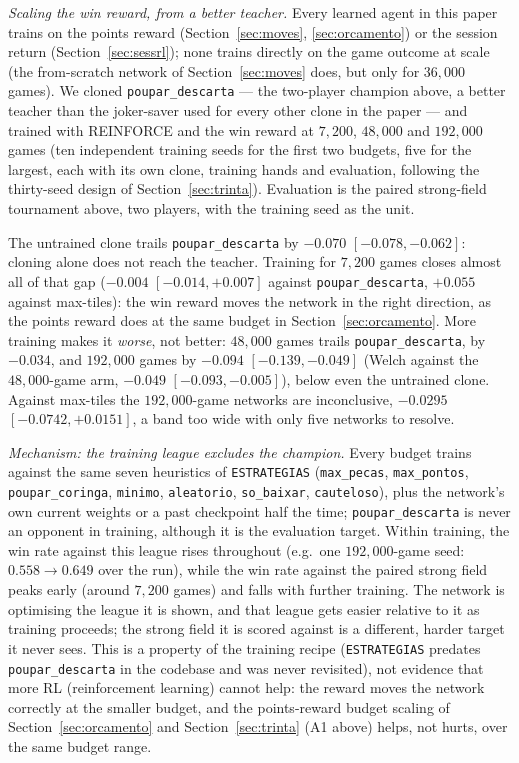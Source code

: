 \documentclass[11pt]{article}
\begin{document}
\emph{Scaling the win reward, from a better teacher.} Every learned agent in this paper trains on the points reward (Section~\ref{sec:moves}, \ref{sec:orcamento}) or the session return (Section~\ref{sec:sessrl}); none trains directly on the game outcome at scale (the from-scratch network of Section~\ref{sec:moves} does, but only for $36{,}000$ games). We cloned \texttt{poupar\_descarta} --- the two-player champion above, a better teacher than the joker-saver used for every other clone in the paper --- and trained with REINFORCE and the win reward at $7{,}200$, $48{,}000$ and $192{,}000$ games (ten independent training seeds for the first two budgets, five for the largest, each with its own clone, training hands and evaluation, following the thirty-seed design of Section~\ref{sec:trinta}). Evaluation is the paired strong-field tournament above, two players, with the training seed as the unit.

The untrained clone trails \texttt{poupar\_descarta} by $-0.070$ $[-0.078,-0.062]$: cloning alone does not reach the teacher. Training for $7{,}200$ games closes almost all of that gap ($-0.004$ $[-0.014,+0.007]$ against \texttt{poupar\_descarta}, $+0.055$ against max-tiles): the win reward moves the network in the right direction, as the points reward does at the same budget in Section~\ref{sec:orcamento}. More training makes it \emph{worse}, not better: $48{,}000$ games trails \texttt{poupar\_descarta}, by $-0.034$, and $192{,}000$ games by $-0.094$ $[-0.139,-0.049]$ (Welch against the $48{,}000$-game arm, $-0.049$ $[-0.093,-0.005]$), below even the untrained clone. Against max-tiles the $192{,}000$-game networks are inconclusive, $-0.0295$ $[-0.0742,+0.0151]$, a band too wide with only five networks to resolve.

\emph{Mechanism: the training league excludes the champion.} Every budget trains against the same seven heuristics of \texttt{ESTRATEGIAS} (\texttt{max\_pecas}, \texttt{max\_pontos}, \texttt{poupar\_coringa}, \texttt{minimo}, \texttt{aleatorio}, \texttt{so\_baixar}, \texttt{cauteloso}), plus the network's own current weights or a past checkpoint half the time; \texttt{poupar\_descarta} is never an opponent in training, although it is the evaluation target. Within training, the win rate against this league rises throughout (e.g.\ one $192{,}000$-game seed: $0.558\to0.649$ over the run), while the win rate against the paired strong field peaks early (around $7{,}200$ games) and falls with further training. The network is optimising the league it is shown, and that league gets easier relative to it as training proceeds; the strong field it is scored against is a different, harder target it never sees. This is a property of the training recipe (\texttt{ESTRATEGIAS} predates \texttt{poupar\_descarta} in the codebase and was never revisited), not evidence that more RL (reinforcement learning) cannot help: the reward moves the network correctly at the smaller budget, and the points-reward budget scaling of Section~\ref{sec:orcamento} and Section~\ref{sec:trinta} (A1 above) helps, not hurts, over the same budget range.
\end{document}
